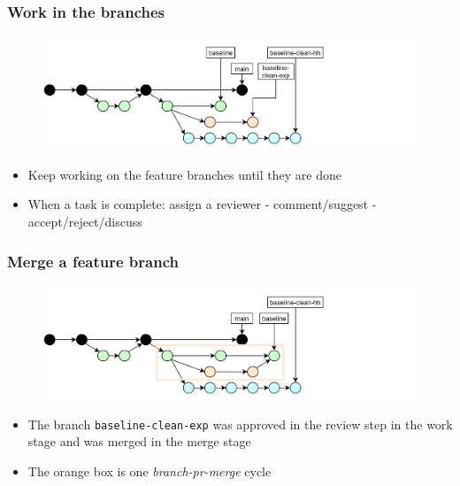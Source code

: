 \documentclass[aspectratio=169]{beamer} %
\begin{document}
\begin{frame}
	\frametitle{Work in the branches}
	
	\vspace{-.5cm}
	\begin{minipage}[t][5cm][t]{\textwidth}
		\begin{figure}
			\centering
			\includegraphics[width=\textwidth]{./img/dime-gitflow-network-2-3.png}
		\end{figure}
	\end{minipage}  
	
	\vspace{-.5cm}
	\begin{minipage}[t][5cm][t]{\textwidth}
		\begin{itemize}
			\setlength\itemsep{.5em}
			\item Keep working on the feature branches until they are done
			\item When a task is complete: assign a reviewer - comment/suggest - accept/reject/discuss
		\end{itemize}
	\end{minipage}  
\end{frame}

\begin{frame}
	\frametitle{Merge a feature branch}
	
	\vspace{-.5cm}
	\begin{minipage}[t][5cm][t]{\textwidth}
		\begin{figure}
			\centering
			\includegraphics[width=\textwidth]{./img/dime-gitflow-network-2-4.png}
		\end{figure}
	\end{minipage}  
	
	\vspace{-.5cm}
	\begin{minipage}[t][5cm][t]{\textwidth}
		\begin{itemize}
			\setlength\itemsep{.5em}
			\item The branch \texttt{baseline-clean-exp} was approved in the review step in the work stage and was merged in the merge stage
			\item The orange box is one \textit{branch-pr-merge} cycle
		\end{itemize}
	\end{minipage}  
\end{frame}
\end{document}
